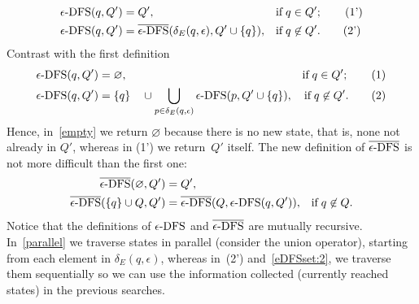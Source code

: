 \begin{align*}
  \epsilon\text{-DFS} (q, Q')
&= Q',
&& \text{if} \; q \in Q'; \tag{1'}\\
  \epsilon\text{-DFS} (q, Q')
&= \overline{\epsilon\text{-DFS}} (\delta_E (q, \epsilon), Q' \cup \{q\}),
&& \text{if} \; q \not\in Q'. \tag{2'}
\end{align*}
Contrast with the first definition
\begin{align*}
   \epsilon\text{-DFS} (q, Q') 
&= \varnothing,
& \text{if} \; q \in Q'; \tag{1} \label{empty}\\
  \epsilon\text{-DFS} (q, Q') 
&= \{q\} \quad \cup \bigcup_{p \in \delta_E(q,\epsilon)}{\epsilon\text{-DFS} (p, Q'
    \cup \{q\})},
& \text{if} \; q \not\in Q'. \tag{2} \label{parallel}
\end{align*}
Hence, in~\eqref{empty} we return \(\varnothing\) because there is no
new state, that is, none not already in \(Q'\), whereas in (1') we
return~\(Q'\) itself. The new definition of \(\overline{\epsilon\text{-DFS}}\) is not more
difficult than the first one:
\begin{align}
   \overline{\epsilon\text{-DFS}} (\varnothing, Q')
&= Q',\label{eDFSset:1}\\
   \overline{\epsilon\text{-DFS}} (\{q\} \cup Q, Q')
&= \overline{\epsilon\text{-DFS}} (Q, \epsilon\text{-DFS} (q, Q')),
& \text{if} \; q \not\in Q. \label{eDFSset:2}
\end{align}
Notice that the definitions of \(\epsilon\text{-DFS}\) and \(\overline{\epsilon\text{-DFS}}\) are mutually
recursive. In~\eqref{parallel} we traverse states in parallel
(consider the union operator), starting from each element in
\(\delta_E (q, \epsilon)\), whereas in~(2') and~\eqref{eDFSset:2}, we
traverse them sequentially so we can use the information collected
(currently reached states) in the previous searches.

